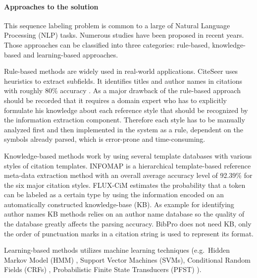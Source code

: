 \paragraph{Approaches to the solution} This sequence labeling problem is common to a large of Natural Language Processing (NLP) tasks. Numerous studies have been proposed in recent years. Those approaches can be classified into three categories: rule-based, knowledge-based and learning-based approaches.

Rule-based methods are widely used in real-world applications. CiteSeer \cite{lawrence1999dla} uses heuristics to extract subfields. It identifies titles and author names in citations with roughly 80\% accuracy \cite{giles1998cac}. As a major drawback of the rule-based approach should be recorded that it requires a domain expert who has to explicitly formulate his knowledge about each reference style that should be recognized by the information extraction component. Therefore each style has to be manually analyzed first and then implemented in the system as a rule, dependent on the symbols already parsed, which is error-prone and time-consuming.

Knowledge-based methods work by using several template databases with various styles of citation templates. INFOMAP \cite{day2007} is a hierarchical template-based reference meta-data extraction method with an overall average accuracy level of 92.39\% for the six major citation styles. FLUX-CiM \cite{cortez2007} estimates the probability that a token can be labeled as a certain type by using the information encoded on an automatically constructed knowledge-base (KB). As example for identifying author names KB methods relies on an author name database so the quality of the database greatly affects the parsing accuracy. BibPro \cite{chen2008bcp} does not need KB, only the order of punctuation marks in a citation string is used to represent its format.

Learning-based methods utilizes machine learning techniques (e.g.\ Hidden Markov Model (HMM) \cite{hetzner2008smc}, Support Vector Machines (SVMs), Conditional Random Fields (CRFs) \cite{peng2004aie, councill:pos}, Probabilistic Finite State Transducers (PFST) \cite{kramer2007}).

